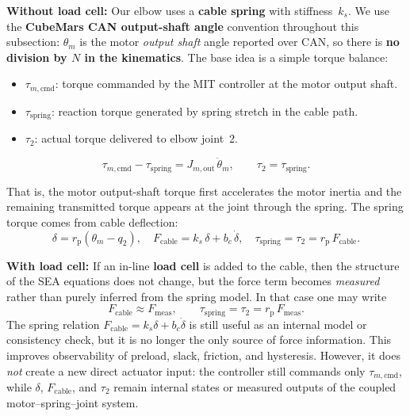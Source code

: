 \documentclass[11pt,a4paper]{article}
\newcommand{\rp}{r_{\mathrm{p}}}
\begin{document}
\textbf{Without load cell:} Our elbow uses a \textbf{cable spring} with stiffness~$k_s$.  We use the
\textbf{CubeMars CAN output-shaft angle} convention throughout this subsection:
$\theta_m$ is the motor \emph{output shaft} angle reported over CAN, so there is
\textbf{no division by $N$ in the kinematics}.  The base idea is a simple torque balance:

\begin{itemize}[leftmargin=2em]
  \item $\tau_{m,\mathrm{cmd}}$: torque commanded by the MIT controller at the
        motor output shaft.
  \item $\tau_{\mathrm{spring}}$: reaction torque generated by spring stretch in the cable path.
  \item $\tau_2$: actual torque delivered to elbow joint~2.
\end{itemize}

\begin{equation}
  \tau_{m,\mathrm{cmd}} - \tau_{\mathrm{spring}} = J_{m,\mathrm{out}}\,\ddot{\theta}_m,
  \qquad
  \tau_2 = \tau_{\mathrm{spring}}.
  \label{eq:sea_torque_balance}
\end{equation}

That is, the motor output-shaft torque first accelerates the motor inertia and the
remaining transmitted torque appears at the joint through the spring.  The spring torque
comes from cable deflection:
\begin{equation}
  \delta = \rp(\theta_m - q_2), \quad
  F_{\mathrm{cable}} = k_s\,\delta + b_c\,\dot{\delta}, \quad
  \tau_{\mathrm{spring}} = \tau_2 = \rp\,F_{\mathrm{cable}}.
  \label{eq:sea_recap}
\end{equation}

\textbf{With load cell:} If an in-line \textbf{load cell} is added to the cable, then the structure of the SEA
equations does not change, but the force term becomes \emph{measured} rather than
purely inferred from the spring model.  In that case one may write
\begin{equation}
  F_{\mathrm{cable}} \approx F_{\mathrm{meas}},
  \qquad
  \tau_{\mathrm{spring}} = \tau_2 = \rp\,F_{\mathrm{meas}}.
  \label{eq:sea_loadcell}
\end{equation}
The spring relation $F_{\mathrm{cable}} = k_s\delta + b_c\dot{\delta}$ is still useful as
an internal model or consistency check, but it is no longer the only source of force
information.  This improves observability of preload, slack, friction, and hysteresis.
However, it does \emph{not} create a new direct actuator input: the controller still
commands only $\tau_{m,\mathrm{cmd}}$, while $\delta$, $F_{\mathrm{cable}}$, and
$\tau_2$ remain internal states or measured outputs of the coupled motor--spring--joint
system.
\end{document}
